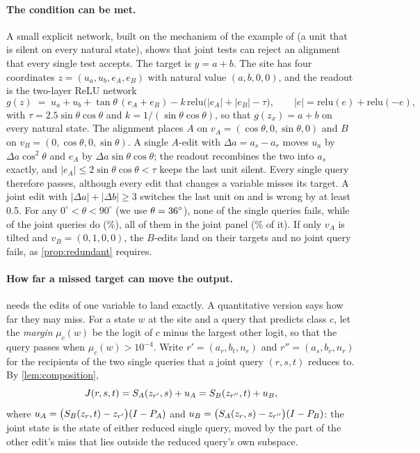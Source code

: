 \paragraph{The condition can be met.}
A small explicit network, built on the mechanism of the example of \citet[Section~4.2]{grant2026divergent} (a unit
that is silent on every natural state), shows that joint tests can reject an alignment that every single test
accepts. The target is $y=a+b$. The site has four coordinates $z=(u_a,u_b,e_A,e_B)$ with natural value
$(a,b,0,0)$, and the readout is the two-layer ReLU network
\[
  g(z) \;=\; u_a+u_b+\tan\theta\,(e_A+e_B)-k\,\mathrm{relu}\bigl(|e_A|+|e_B|-\tau\bigr),\qquad
  |e|=\mathrm{relu}(e)+\mathrm{relu}(-e),
\]
with $\tau=2.5\sin\theta\cos\theta$ and $k=1/(\sin\theta\cos\theta)$, so that $g(z_x)=a+b$ on every natural state.
The alignment places $A$ on $v_A=(\cos\theta,0,\sin\theta,0)$ and $B$ on $v_B=(0,\cos\theta,0,\sin\theta)$. A single
$A$-edit with $\Delta a=a_s-a_r$ moves $u_a$ by $\Delta a\cos^2\theta$ and $e_A$ by $\Delta a\sin\theta\cos\theta$; the
readout recombines the two into $a_s$ exactly, and $|e_A|\le 2\sin\theta\cos\theta<\tau$ keeps the last unit silent.
Every single query therefore passes, although every edit that changes a variable misses its target. A joint edit
with $|\Delta a|+|\Delta b|\ge 3$ switches the last unit on and is wrong by at least 0.5. For any
$0^\circ<\theta<90^\circ$ (we use $\theta=36^\circ$), none of the \ExSingleQueries{} single queries fails,
while \ExJointFailures{} of the \ExJointQueries{} joint queries do (\ExJointShare\%), all of them in the joint panel
(\ExPanelShare\% of it). If only $v_A$ is tilted and $v_B=(0,1,0,0)$, the $B$-edits land on their targets and no
joint query fails, as \cref{prop:redundant} requires.

\paragraph{How far a missed target can move the output.}
 needs the edits of one variable to land exactly. A quantitative version says how far they may
miss. For a state $w$ at the site and a query that predicts class $c$, let the \emph{margin} $\mu_c(w)$ be the logit
of $c$ minus the largest other logit, so that the query passes when $\mu_c(w)>10^{-4}$. Write $r'=(a_r,b_t,n_r)$ and
$r''=(a_s,b_r,n_r)$ for the recipients of the two single queries that a joint query $(r,s,t)$ reduces to. By
\cref{lem:composition},
\begin{equation}\label{eq:split}
  J(r,s,t)=S_A(z_{r'},s)+u_A=S_B(z_{r''},t)+u_B,
\end{equation}
where $u_A=\bigl(S_B(z_r,t)-z_{r'}\bigr)(I-P_A)$ and $u_B=\bigl(S_A(z_r,s)-z_{r''}\bigr)(I-P_B)$: the joint state is
the state of either reduced single query, moved by the part of the other edit's miss that lies outside the reduced
query's own subspace.

